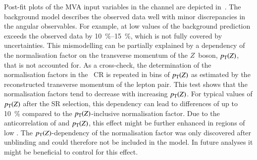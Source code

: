 Post-fit plots of the MVA input variables in the \hadhad channel are depicted
in~. The background model describes the observed
data well with minor discrepancies in the angular observables. For example, at
low values of \dRtautau the background prediction exceeds the observed data by
\SIrange{10}{15}{\percent}, which is not fully covered by uncertainties. This
mismodelling can be partially explained by a dependency of the \ZHF
normalisation factor on the transverse momentum of the $Z$~boson, $p_{\text{T}}(Z)$, that
is not accounted for. As a cross-check, the determination of the normalisation
factors in the \ZHF~CR is repeated in bins of $p_{\text{T}}(Z)$ as estimated by the
reconstructed transverse momentum of the lepton pair. This test shows that the
\ZHF normalisation factors tend to decrease with increasing $p_{\text{T}}(Z)$. For
typical values of $p_{\text{T}}(Z)$ after the \hadhad SR selection, this dependency can
lead to differences of up to \SI{10}{\percent} compared to the
$p_{\text{T}}(Z)$-inclusive normalisation factor. Due to the anticorrelation of \dRtautau
and $p_{\text{T}}(Z)$, this effect might be further enhanced in regions of low
\dRtautau. The $p_{\text{T}}(Z)$-dependency of the normalisation factor was only
discovered after unblinding and could therefore not be included in the model. In
future analyses it might be beneficial to control for this effect.


